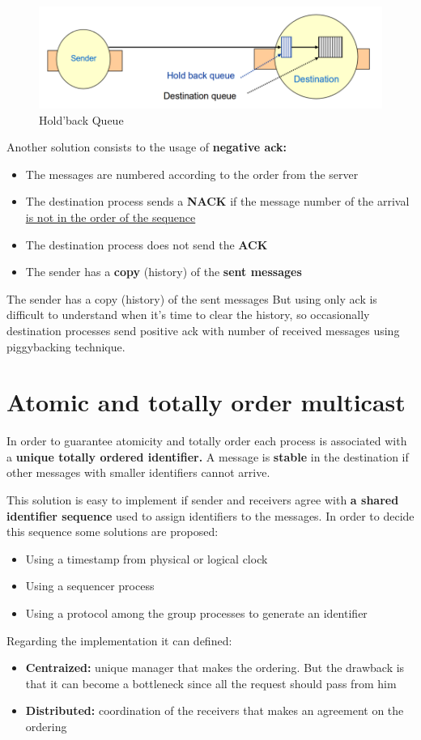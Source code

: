 \begin{figure}[!h]
    \centering
    \includegraphics[width=.7\linewidth]{images/multicastCommunication/reliabilityatomicity.png}
    \caption{Hold'back Queue}
\end{figure}

Another solution consists to the usage of \textbf{negative ack:}
\begin{itemize}
    \item The messages are numbered according to the order from the server
    \item The destination process sends a \textbf{NACK} if the message number of the arrival \underline{is not in the order of the sequence}
    \item The destination process does not send the \textbf{ACK}
    \item The sender has a \textbf{copy} (history) of the \textbf{sent messages}
\end{itemize}
The sender has a copy (history) of the sent messages
But using only ack is difficult to understand when it’s time to clear the history, so occasionally destination processes send positive ack with number of received messages using piggybacking technique.


\section{Atomic and totally order multicast}
In order to guarantee atomicity and totally order each process is associated with a \textbf{unique totally ordered identifier.}
A message is \textbf{stable} in the destination if other messages with smaller identifiers cannot arrive.

This solution is easy to implement if sender and receivers agree with \textbf{a shared identifier sequence} used to assign identifiers to the messages. In order to decide this sequence some solutions are proposed:
\begin{itemize}
    \item Using a timestamp from physical or logical clock
    \item Using a sequencer process
    \item Using a protocol among the group processes to generate an identifier
\end{itemize}
Regarding the implementation it can defined:
\begin{itemize}
    \item \textbf{Centraized:} unique manager that makes the ordering. But the drawback is that it can become a bottleneck since all the request should pass from him
    \item \textbf{Distributed:} coordination of the receivers that makes an agreement on the ordering
\end{itemize}

